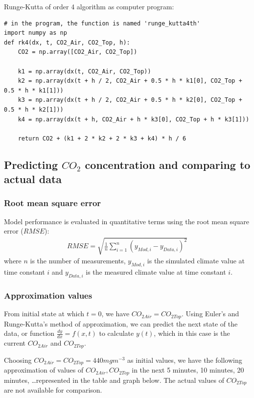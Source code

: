 \documentclass[a4paper]{article}
\numberwithin{equation}{section}
\begin{document}
Runge-Kutta of order 4 algorithm as computer program:
\begin{mdframed}[leftline=false,rightline=false,backgroundcolor=magenta!10,nobreak=true]
  \begin{verbatim}
# in the program, the function is named 'runge_kutta4th'
import numpy as np
def rk4(dx, t, CO2_Air, CO2_Top, h):
    CO2 = np.array([CO2_Air, CO2_Top])

    k1 = np.array(dx(t, CO2_Air, CO2_Top))
    k2 = np.array(dx(t + h / 2, CO2_Air + 0.5 * h * k1[0], CO2_Top + 0.5 * h * k1[1]))
    k3 = np.array(dx(t + h / 2, CO2_Air + 0.5 * h * k2[0], CO2_Top + 0.5 * h * k2[1]))
    k4 = np.array(dx(t + h, CO2_Air + h * k3[0], CO2_Top + h * k3[1]))

    return CO2 + (k1 + 2 * k2 + 2 * k3 + k4) * h / 6
  \end{verbatim}
\end{mdframed}

\subsection{Predicting \texorpdfstring{\( CO_2 \)}{} concentration and comparing to actual data}
\subsubsection{Root mean square error}
Model performance is evaluated in quantitative terms using the root mean square error (\( RMSE \)):
\begin{align}
  \label{eq:rmse}
  RMSE = \sqrt{\frac{1}{n} \sum_{i=1}^{n} {\left(y_{Mod,i} - y_{Data,i}\right)}^2}
\end{align}
where \( n \) is the number of measurements, \( y_{Mod,i} \) is the simulated climate value at time constant \( i \) and \( y_{Data,i} \) is the measured climate value at time constant \( i \).

\subsubsection{Approximation values}
From initial state at which \( t = 0 \), we have \( CO_{2Air} = CO_{2Top} \). Using Euler's and Runge-Kutta's method of approximation, we can predict the next state of the data, or function \( \frac{dy}{dx} = f(x, t) \) to calculate \( y(t) \), which in this case is the current \( CO_{2Air} \) and \( CO_{2Top} \).

Choosing \( CO_{2Air} = CO_{2Top} = 440 mg m^{-3} \) as initial values, we have the following approximation of values of \( CO_{2Air}, CO_{2Top} \) in the next 5 minutes, 10 minutes, 20 minutes, \dots represented in the table and graph below. The actual values of \( CO_{2Top} \) are not available for comparison.
\end{document}
